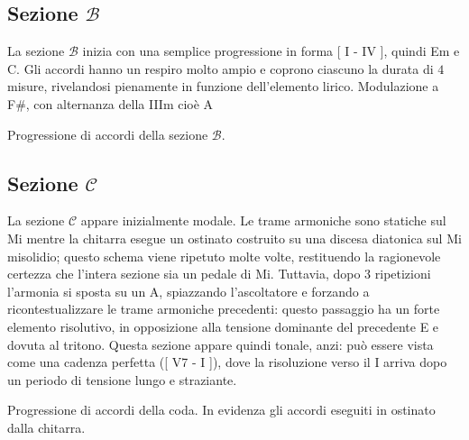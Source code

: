 \documentclass[class=book, crop=false, oneside, 12pt]{standalone}
\begin{document}
    \subsection{Sezione \(\mathcal{B}\)}
    La sezione \(\mathcal{B}\) inizia con una semplice progressione in forma [ I - IV ], quindi Em e C. Gli accordi hanno un respiro molto ampio e coprono ciascuno la durata di \(4\) misure, rivelandosi pienamente in funzione dell'elemento lirico. 
    Modulazione a F\#, con alternanza della IIIm cioè A

    
    \begin{sheet}[htbp]
        \centering
        \caption{Progressione di accordi della sezione \(\mathcal{B}\).}
        \label{sheet:sheep-b_chords}
    \end{sheet}
    

    \subsection{Sezione \(\mathcal{C}\)}
    La sezione \(\mathcal{C}\) appare inizialmente modale. Le trame armoniche sono statiche sul Mi mentre la chitarra esegue un ostinato costruito su una discesa diatonica sul Mi misolidio; questo schema viene ripetuto molte volte, restituendo la ragionevole certezza che l'intera sezione sia un pedale di Mi. Tuttavia, dopo 3 ripetizioni l'armonia si sposta su un A, spiazzando l'ascoltatore e forzando a ricontestualizzare le trame armoniche precedenti: questo passaggio ha un forte elemento risolutivo, in opposizione alla tensione dominante del precedente E e dovuta al tritono. Questa sezione appare quindi tonale, anzi: può essere vista come una cadenza perfetta ([ V7 - I ]), dove la risoluzione verso il I arriva dopo un periodo di tensione lungo e straziante.

    
    \begin{sheet}[htbp]
        \centering
        \caption{Progressione di accordi della coda. In evidenza gli accordi eseguiti in ostinato dalla chitarra.}
        \label{sheet:sheep-guitar_out_chords}
    \end{sheet}
    
\end{document}
